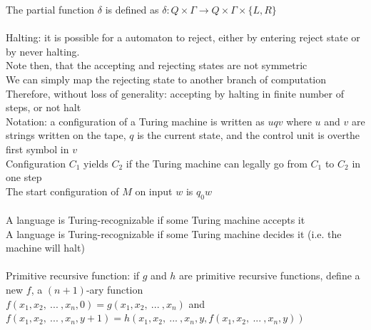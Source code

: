 \documentclass{article}
\newcommand*{\<}{\langle}
\renewcommand*{\>}{\rangle}
\begin{document}
			The partial function $\delta$ is defined as $\delta: Q \times \Gamma \to Q \times \Gamma \times \{L, R\}$ \\
			\\
			Halting: it is possible for a automaton to reject, either by entering reject state or by never halting. \\
			Note then, that the accepting and rejecting states are not symmetric \\
			We can simply map the rejecting state to another branch of computation \\
			Therefore, without loss of generality: accepting by halting in finite number of steps, or not halt
			\\
			Notation: a configuration of a Turing machine is written as $uqv$ where $u$ and $v$ are strings written on the tape, $q$ is the current state, and the control unit is overthe first symbol in $v$ \\
			Configuration $C_1$ yields $C_2$ if the Turing machine can legally go from $C_1$ to $C_2$ in one step \\
			The start configuration of $M$ on input $w$ is $q_0w$ \\
			\\
			A language is Turing-recognizable if some Turing machine accepts it \\
			A language is Turing-recognizable if some Turing machine decides it (i.e. the machine will halt) \\
			\\
			Primitive recursive function: if $g$ and $h$ are primitive recursive functions, define a new $f$, a $(n + 1)$-ary function \\
			$f(x_1, x_2,\:...\:, x_n, 0) = g(x_1, x_2,\:...\:, x_n)$ and \\
			$f(x_1, x_2,\:...\:, x_n, y + 1) = h(x_1, x_2,\:...\:, x_n, y, f(x_1, x_2,\:...\:, x_n, y))$
\end{document}
